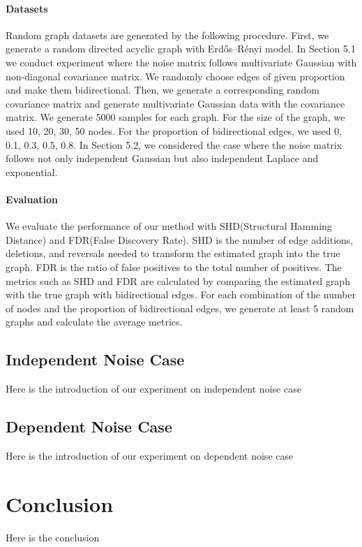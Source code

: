 \documentclass[10pt]{article}
\begin{document}
\paragraph*{Datasets} Random graph datasets are generated by the following procedure. First, we generate a random directed acyclic graph with Erdős–Rényi model. In Section 5.1 we conduct experiment where the noise matrix follows multivariate Gaussian with non-diagonal covariance matrix. We randomly choose edges of given proportion and make them bidirectional. Then, we generate a corresponding random covariance matrix and generate multivariate Gaussian data with the covariance matrix. We generate 5000 samples for each graph. For the size of the graph, we used 10, 20, 30, 50 nodes. For the proportion of bidirectional edges, we used 0, 0.1, 0.3, 0.5, 0.8. In Section 5.2, we considered the case where the noise matrix follows not only independent Gaussian but also independent Laplace and exponential.\\

\paragraph*{Evaluation} We evaluate the performance of our method with SHD(Structural Hamming Distance) and FDR(False Discovery Rate). SHD is the number of edge additions, deletions, and reversals needed to transform the estimated graph into the true graph. FDR is the ratio of false positives to the total number of positives. The metrics such as SHD and FDR are calculated by comparing the estimated graph with the true graph with bidirectional edges. For each combination of the number of nodes and the proportion of bidirectional edges, we generate at least 5 random graphs and calculate the average metrics.\\

\subsection{Independent Noise Case}

Here is the introduction of our experiment on independent noise case

\subsection{Dependent Noise Case}

Here is the introduction of our experiment on dependent noise case

\section{Conclusion}

Here is the conclusion



\end{document}
